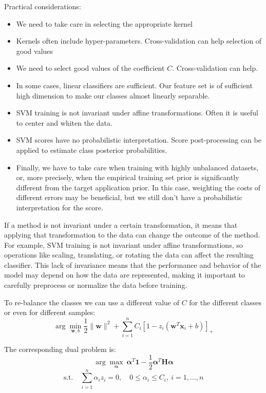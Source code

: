Practical considerations:
\begin{itemize}
    \item We need to take care in selecting the appropriate kernel
    \item Kernels often include hyper-parameters. Cross-validation can help selection of good values
    \item We need to select good values of the coefficient $C$. Cross-validation can help.
    \item In some cases, linear classifiers are sufficient. Our feature set is of sufficient high dimension to make our classes almost linearly separable.
    \item SVM training is not invariant under affine transformations. Often it is useful to center and whiten the data.
    \item SVM scores have no probabilistic interpretation. Score post-processing can be applied to estimate class posterior probabilities.
    \item Finally, we have to take care when training with highly unbalanced datasets, or, more precisely, when the empirical training set prior is significantly different from the target application prior. In this case, weighting the costs of different errors may be beneficial, but we still don't have a probabilistic interpretation for the score.
\end{itemize}

If a method is not invariant under a certain transformation, it means that applying that
transformation to the data can change the outcome of the method. For example, SVM training is not
invariant under affine transformations, so operations like scaling, translating, or rotating the data
can affect the resulting classifier. This lack of invariance means that the performance and behavior
of the model may depend on how the data are represented, making it important to carefully
preprocess or normalize the data before training.

To re-balance the classes we can use a different value of $C$ for the different classes or
even for different samples:
\[
\arg\min_{\mathbf{w},b} \frac{1}{2}\|\mathbf{w}\|^2 + \sum_{i=1}^n C_i \left[1 - z_i(\mathbf{w}^T \mathbf{x}_i + b)\right]_+
\]

The corresponding dual problem is:
\[
\arg\max_{\boldsymbol{\alpha}}\ \boldsymbol{\alpha}^T \mathbf{1} - \frac{1}{2}\boldsymbol{\alpha}^T \mathbf{H} \boldsymbol{\alpha}
\]
\[
\text{s.t.} \quad \sum_{i=1}^n \alpha_i z_i = 0,\quad 0 \leq \alpha_i \leq C_i,\ i = 1,\ldots,n
\]

